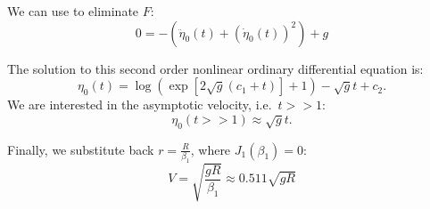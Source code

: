 We can use  to eliminate $F$:
\begin{equation}
0 = -\left(\ddot\eta_0(t)+(\dot\eta_0(t))^2\right) + g 
\end{equation}

The solution to this second order nonlinear ordinary differential equation is:
\begin{equation}
\eta_0(t) = \log\left( \exp\left[2 \sqrt{g} (c_1 + t) \right] + 1 \right) - \sqrt{g}t + c_2.
\end{equation}
We are interested in the asymptotic velocity, i.e.\ $t >> 1$:
\begin{equation}
\eta_0(t>>1) \approx  \sqrt{g}t .
\end{equation}

Finally, we substitute back $r = \frac{R}{\beta_1}$, where $J_1(\beta_1) = 0$:
\begin{equation}
V = \sqrt{\frac{g R}{\beta_1}} \approx 0.511 \sqrt{g R}
\end{equation}

